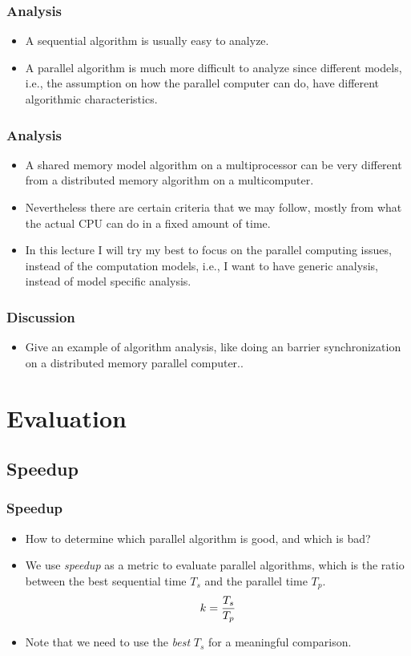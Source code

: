 \documentclass{beamer}
\begin{document}
\begin{CJK}{UTF8}{bsmi}
\begin{frame}
\frametitle{Analysis}
\begin{itemize}
\item A sequential algorithm is usually easy to analyze.
\item A parallel algorithm is much more difficult to analyze since
  different models, i.e., the assumption on how the parallel computer
  can do, have different algorithmic characteristics.
\end{itemize}
\end{frame}

\begin{frame}
\frametitle{Analysis}
\begin{itemize}
\item A shared memory model algorithm on a multiprocessor can be very
  different from a distributed memory algorithm on a multicomputer.
\item Nevertheless there are certain criteria that we may follow,
  mostly from what the actual CPU can do in a fixed amount of time.
\item In this lecture I will try my best to focus on the parallel
  computing issues, instead of the computation models, i.e., I want to
  have generic analysis, instead of model specific analysis.
\end{itemize}
\end{frame}

\begin{frame}
\frametitle{Discussion}
\begin{itemize}
\item Give an example of algorithm analysis, like doing an barrier
  synchronization on a distributed memory parallel computer..
\end{itemize}
\end{frame}

\section{Evaluation}

\subsection{Speedup}

\begin{frame}
\frametitle{Speedup}
\begin{itemize}
\item How to determine which parallel algorithm is good, and which is
  bad?
\item We use {\em speedup} as a metric to evaluate parallel
  algorithms, which is the ratio between the best sequential time $T_s$
  and the parallel time $T_p$.
\begin{equation} 
k = {{T_s}\over{T_p}}
\end{equation}
\item Note that we need to use the {\em best} $T_s$ for a meaningful
  comparison.
\end{itemize}
\end{frame}


\end{CJK}
\end{document}
